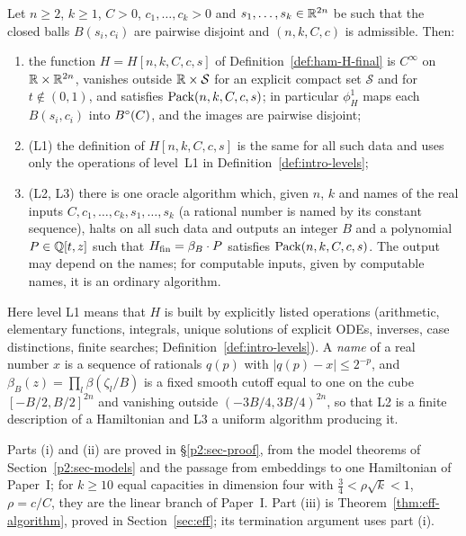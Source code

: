\begin{maintheorem}\label{thm:main}
Let $n\ge2$, $k\ge1$, $C>0$, $c_1,\dots,c_k>0$ and $s_1,\dots,s_k\in\mathbb{R}^{2n}$ be such that the closed balls
$B(s_i,c_i)$ are pairwise disjoint and $(n,k,C,c)$ is admissible. Then:
\begin{enumerate}[label=(\roman*)]
\item the function $H=H[n,k,C,c,s]$ of Definition~\ref{def:ham-H-final} is $C^\infty$ on $\mathbb{R}\times\mathbb{R}^{2n}$,
 vanishes outside $\mathbb{R}\times\mathcal S$ for an explicit compact set $\mathcal S$ and for $t\notin(0,1)$, and
 satisfies $\mathrm{Pack}(n,k,C,c,s)$; in particular $\phi^1_H$ maps each $B(s_i,c_i)$ into $B^{\circ}(C)$, and the
 images are pairwise disjoint;
\item \textup{(L1)} the definition of $H[n,k,C,c,s]$ is the same for all such data and uses only the
 operations of level~L1 in Definition~\ref{def:intro-levels};
\item \textup{(L2, L3)} there is one oracle algorithm which, given $n$, $k$ and names of the real inputs
 $C,c_1,\dots,c_k,s_1,\dots,s_k$ (a rational number is named by its constant sequence), halts on all such data and
 outputs an integer $B$ and a polynomial $P\in\mathbb{Q}[t,z]$ such that $H_{\mathrm{fin}}=\beta_B\cdot P$ satisfies
 $\mathrm{Pack}(n,k,C,c,s)$. The output may depend on the names; for computable inputs, given by computable names, it is an
 ordinary algorithm.
\end{enumerate}
\end{maintheorem}

Here level L1 means that $H$ is built by explicitly listed operations (arithmetic, elementary functions, integrals,
unique solutions of explicit ODEs, inverses, case distinctions, finite searches; Definition~\ref{def:intro-levels}).
A \emph{name} of a real number $x$ is a sequence of rationals $q(p)$ with $|q(p)-x|\le2^{-p}$, and
$\beta_B(z)=\prod_l\beta(\zeta_l/B)$ is a fixed smooth cutoff equal to one on the cube $[-B/2,B/2]^{2n}$ and vanishing outside
$(-3B/4,3B/4)^{2n}$, so that L2 is a finite description of a Hamiltonian and L3 a uniform algorithm producing it.

Parts (i) and (ii) are proved in \S\ref{p2:sec-proof}, from the model theorems of Section~\ref{p2:sec-models} and the
passage from embeddings to one Hamiltonian of Paper~I; for $k\ge10$ equal capacities in dimension four with
$\frac34<\rho\sqrt k<1$, $\rho=c/C$, they are the linear branch of Paper~I. Part (iii) is
Theorem~\ref{thm:eff-algorithm}, proved in Section~\ref{sec:eff}; its termination argument uses part (i).

